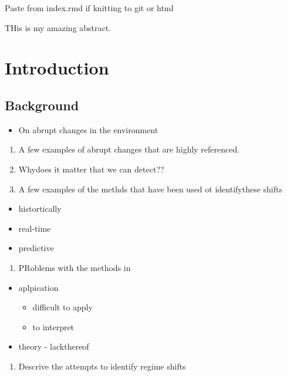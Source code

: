 \documentclass[12pt,twoside]{reedthesis}
\providecommand{\tightlist}{%
  \setlength{\itemsep}{0pt}\setlength{\parskip}{0pt}}
\def\labelenumi{\arabic{enumi}.}
\def\labelenumi{\arabic{enumi}.}
\begin{document}
Paste from index.rmd if knitting to git or html

THis is my amazing abstract.

\chapter{Introduction}\label{intro-chapter}

\section{Background}\label{background}
\begin{itemize}
\tightlist
\item
  On abrupt changes in the environment
\end{itemize}
\begin{enumerate}
\def\labelenumi{\arabic{enumi}.}
\tightlist
\item
  A few examples of abrupt changes that are highly referenced.\\
\item
  Whydoes it matter that we can detect??
\item
  A few examples of the methds that have been used ot identifythese
  shifts
\end{enumerate}
\begin{itemize}
\tightlist
\item
  histortically
\item
  real-time
\item
  predictive
\end{itemize}
\begin{enumerate}
\def\labelenumi{\arabic{enumi}.}
\setcounter{enumi}{2}
\tightlist
\item
  PRoblems with the methods in
\end{enumerate}
\begin{itemize}
\tightlist
\item
  aplpication
  \begin{itemize}
  \tightlist
  \item
    difficult to apply
  \item
    to interpret
  \end{itemize}
\item
  theory - lackthereof
\end{itemize}
\begin{enumerate}
\def\labelenumi{\arabic{enumi}.}
\setcounter{enumi}{3}
\tightlist
\item
  Descrive the attempts to identify regime shifts
\end{enumerate}
\end{document}
